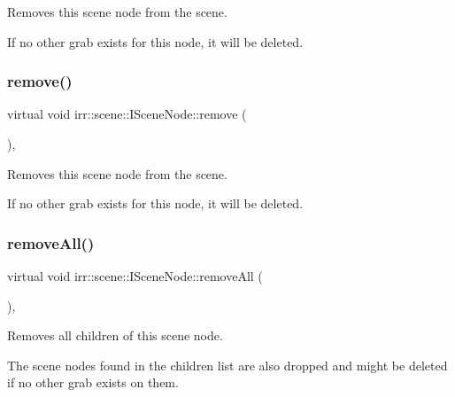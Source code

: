 Removes this scene node from the scene. 

If no other grab exists for this node, it will be deleted. \mbox{\label{classirr_1_1scene_1_1ISceneNode_a2efa2670e29d6bb33b0dd99403b8b69c}} 
\subsubsection{\texorpdfstring{remove()}{remove()}\hspace{0.1cm}{\footnotesize\ttfamily [2/2]}}
{\footnotesize\ttfamily virtual void irr\+::scene\+::\+I\+Scene\+Node\+::remove (\begin{DoxyParamCaption}{ }\end{DoxyParamCaption})\hspace{0.3cm}{\ttfamily [inline]}, {\ttfamily [virtual]}}



Removes this scene node from the scene. 

If no other grab exists for this node, it will be deleted. \mbox{\label{classirr_1_1scene_1_1ISceneNode_a348767bb5b9262d997067c50e079e5be}} 
\subsubsection{\texorpdfstring{remove\+All()}{removeAll()}\hspace{0.1cm}{\footnotesize\ttfamily [1/2]}}
{\footnotesize\ttfamily virtual void irr\+::scene\+::\+I\+Scene\+Node\+::remove\+All (\begin{DoxyParamCaption}{ }\end{DoxyParamCaption})\hspace{0.3cm}{\ttfamily [inline]}, {\ttfamily [virtual]}}



Removes all children of this scene node. 

The scene nodes found in the children list are also dropped and might be deleted if no other grab exists on them. \mbox{\label{classirr_1_1scene_1_1ISceneNode_a348767bb5b9262d997067c50e079e5be}} 
